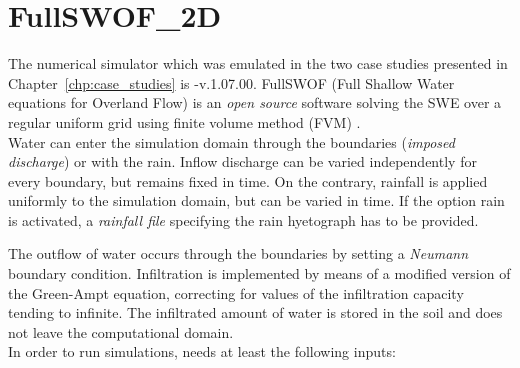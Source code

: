 \section{FullSWOF\_2D}\label{sec:simulator}

The numerical simulator which was emulated in the two case studies presented in Chapter~\ref{chp:case_studies} is -v.1.07.00. FullSWOF (Full Shallow Water equations for Overland Flow) is an \emph{open source} software solving the SWE over a regular uniform grid using finite volume method (FVM) \autocite{the_fullswof_team_fullswof_2018}.\\
 
Water can enter the simulation domain through the boundaries (\emph{imposed discharge}) or with the rain.
Inflow discharge can be varied independently for every boundary, but remains fixed in time.
On the contrary, rainfall is applied uniformly to the simulation domain, but can be varied in time. If the option rain is activated, a \emph{rainfall file} specifying the rain hyetograph has to be provided.

The outflow of water occurs through the boundaries by setting a \emph{Neumann} boundary condition.
Infiltration is implemented by means of a modified version of the Green-Ampt equation, correcting for values of the infiltration capacity tending to infinite.
The infiltrated amount of water is stored in the soil and does not leave the computational domain.\\

\noindent In order to run simulations,  needs at least the following inputs:

